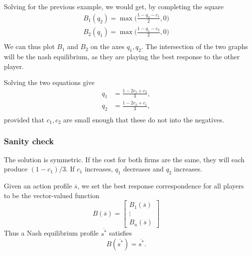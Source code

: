 Solving for the previous example, we would get, by completing the square \begin{align*}
    B_1(q_2)=\max\big(\frac{1-q_2-c_1}{2},0\big)\\
    B_2(q_1)=\max\big(\frac{1-q_1-c_2}{2},0\big)\\
\end{align*}
We can thus plot $B_1$ and $B_2$ on the axes $q_1,q_2$. The intersection of the two graphs will be the nash equilibrium, as they are playing the best response to the other player.
\begin{center}
    
\end{center} Solving the two equations give
\begin{align*}
    q_1&=\frac{1-2c_1+c_2}{3},\\
    q_2&=\frac{1-2c_2+c_1}{3},\\
\end{align*}
provided that $c_1,c_2$ are small enough that these do not into the negatives.
\subsubsection*{Sanity check}
The solution is symmetric. If the cost for both firms are the same, they will each produce $(1-c_1)/3$. If $c_1$ increases, $q_1$ decreases and $q_2$ increases.
\begin{notation}
    Given an action profile $\overline{s}$, we set the best response correspondence for all players to be the vector-valued function \[
    B(\overline{s})=\begin{bmatrix}
        B_1(\overline{s})\\ \vdots\\ B_n(\overline{s})
    \end{bmatrix}
    \]
    Thus a Nash equilibrium profile $\overline{s^*}$ satisfies \[
    B(\overline{s^*})=\overline{s^*}.
    \]
\end{notation}

